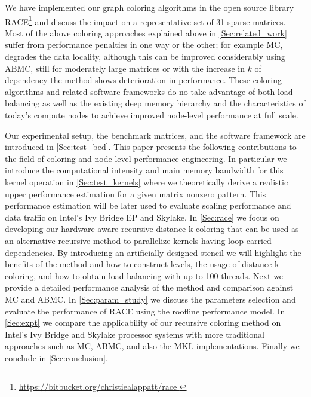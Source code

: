 
We have implemented our graph coloring algorithms in the open source library \acrfull{RACE}\footnote{\href{https://bitbucket.org/christiealappatt/race}{https://bitbucket.org/christiealappatt/race }} and discuss the impact on a representative set of 31 sparse matrices. Most of the above coloring approaches explained above in \cref{Sec:related_work} suffer from performance penalties in one way or the other; for example \acrshort{MC}, degrades the data locality, although this can be improved considerably using \acrshort{ABMC}, still for moderately large matrices or with the increase in $k$ of \DK dependency the method shows deterioration in performance. 
These coloring algorithms and related software frameworks do no take advantage of both load balancing as well as the existing deep memory hierarchy and the characteristics of today’s compute nodes to achieve improved node-level performance at full scale.

Our experimental setup, the benchmark matrices, and the software framework are introduced in \cref{Sec:test_bed}.
This paper presents the following contributions to the field of coloring and node-level performance engineering. In particular we introduce the computational intensity and main memory bandwidth for this kernel operation in \cref{Sec:test_kernels} where we theoretically derive a realistic upper performance estimation for a given matrix nonzero pattern.  This performance estimation will be later used to evaluate scaling performance and data traffic on Intel's Ivy Bridge EP and Skylake. In \cref{Sec:race} we focus on developing our hardware-aware recursive distance-k coloring that can be used as an alternative recursive method to parallelize kernels having loop-carried dependencies. By introducing an artificially designed stencil we will highlight the benefits of the method and how to construct levels, the usage of distance-k coloring, and how to obtain load balancing with up to 100 threads. Next we provide a detailed performance analysis of the method and comparison against \acrshort{MC} and \acrshort{ABMC}. In \cref{Sec:param_study} we discuss the parameters selection and evaluate the performance of \acrshort{RACE} using the roofline performance model. In \cref{Sec:expt} we compare the applicability of our recursive coloring method on Intel’s Ivy Bridge and Skylake processor systems with more traditional approaches such as  \acrshort{MC}, \acrshort{ABMC}, and also the \acrshort{MKL} implementations. Finally we conclude in 
\cref{Sec:conclusion}.


